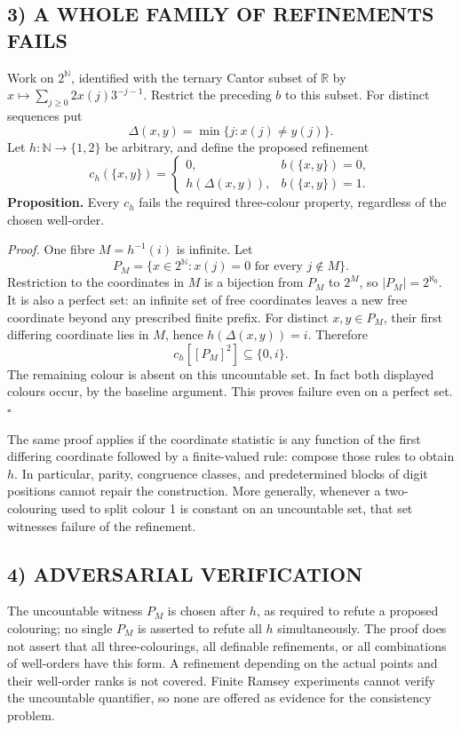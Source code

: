 \subsection*{3) A WHOLE FAMILY OF REFINEMENTS FAILS}
Work on $2^{\mathbb N}$, identified with the ternary Cantor subset of $\mathbb R$ by $x\mapsto\sum_{j\ge0}2x(j)3^{-j-1}$. Restrict the preceding $b$ to this subset. For distinct sequences put
\[
\Delta(x,y)=\min\{j:x(j)\ne y(j)\}.
\]
Let $h:\mathbb N\to\{1,2\}$ be arbitrary, and define the proposed refinement
\[
c_h(\{x,y\})=
\begin{cases}
0,&b(\{x,y\})=0,\\
h(\Delta(x,y)),&b(\{x,y\})=1.
\end{cases}
\]
\textbf{Proposition.} Every $c_h$ fails the required three-colour property, regardless of the chosen well-order.

\emph{Proof.} One fibre $M=h^{-1}(i)$ is infinite. Let
\[
P_M=\{x\in2^{\mathbb N}:x(j)=0\text{ for every }j\notin M\}.
\]
Restriction to the coordinates in $M$ is a bijection from $P_M$ to $2^M$, so $|P_M|=2^{\aleph_0}$. It is also a perfect set: an infinite set of free coordinates leaves a new free coordinate beyond any prescribed finite prefix. For distinct $x,y\in P_M$, their first differing coordinate lies in $M$, hence $h(\Delta(x,y))=i$. Therefore
\[
c_h[[P_M]^2]\subseteq\{0,i\}.
\]
The remaining colour is absent on this uncountable set. In fact both displayed colours occur, by the baseline argument. This proves failure even on a perfect set.\hfill$\square$

The same proof applies if the coordinate statistic is any function of the first differing coordinate followed by a finite-valued rule: compose those rules to obtain $h$. In particular, parity, congruence classes, and predetermined blocks of digit positions cannot repair the construction. More generally, whenever a two-colouring used to split colour 1 is constant on an uncountable set, that set witnesses failure of the refinement.

\subsection*{4) ADVERSARIAL VERIFICATION}
The uncountable witness $P_M$ is chosen after $h$, as required to refute a proposed colouring; no single $P_M$ is asserted to refute all $h$ simultaneously. The proof does not assert that all three-colourings, all definable refinements, or all combinations of well-orders have this form. A refinement depending on the actual points and their well-order ranks is not covered. Finite Ramsey experiments cannot verify the uncountable quantifier, so none are offered as evidence for the consistency problem.

